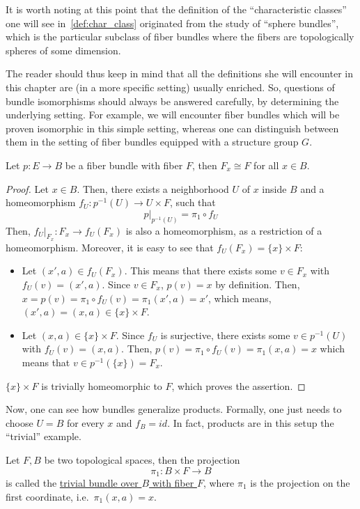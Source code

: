 It is worth noting at this point that the definition of the ``characteristic classes'' one will see in~\ref{def:char_class} originated from the study of ``sphere bundles'', which is the particular subclass of fiber bundles where the fibers are topologically spheres of some dimension.

The reader should thus keep in mind that all the definitions she will encounter in this chapter are (in a more specific setting) usually enriched. So, questions of bundle isomorphisms should always be answered carefully, by determining the underlying setting. For example, we will encounter fiber bundles which will be proven isomorphic in this simple setting, whereas one can distinguish between them in the setting of fiber bundles equipped with a structure group $G$.

\begin{proposition}\label{prop:same_fiber} Let $p:E\to B$ be a fiber bundle with fiber $F$, then $F_x\cong F$ for all $x\in B$.
\end{proposition}
\begin{proof}
Let $x\in B$. Then, there exists a neighborhood $U$ of $x$ inside $B$ and a homeomorphism $f_U:p^{-1}(U)\to U\times F$, such that
\[p|_{p^{-1}(U)}=\pi_1\circ f_U\]
Then, $f_U|_{F_x}:F_x\to f_U(F_x)$ is also a homeomorphism, as a restriction of a homeomorphism. Moreover, it is easy to see that $f_U(F_x)=\{x\}\times F$:
\begin{itemize}
\item Let $(x',a)\in f_U(F_x)$. This means that there exists some $v\in F_x$ with $f_U(v)=(x',a)$. Since $v\in F_x$, $p(v)=x$ by definition. Then, $x=p(v)=\pi_1\circ f_U(v)=\pi_1(x',a)=x'$, which means, $(x',a)=(x,a)\in\{x\}\times F$.
\item Let $(x,a)\in\{x\}\times F$. Since $f_U$ is surjective, there exists some $v\in p^{-1}(U)$ with $f_U(v)=(x,a)$. Then, $p(v)=\pi_1\circ f_U(v)=\pi_1(x,a)=x$ which means that $v\in p^{-1}(\{x\})=F_x$.
\end{itemize}
$\{x\}\times F$ is trivially homeomorphic to $F$, which proves the assertion.
\end{proof}

Now, one can see how bundles generalize products. Formally, one just needs to choose $U=B$ for every $x$ and $f_B=id$. In fact, products are in this setup the ``trivial'' example.
\begin{definition} Let $F, B$ be two topological spaces, then the projection
\[\pi_1:B\times F\to B\]
is called the \ul{trivial bundle over $B$ with fiber $F$}, where $\pi_1$ is the projection on the first coordinate, i.e.\ $\pi_1(x,a)=x$.
\end{definition}

